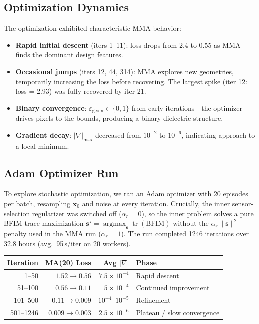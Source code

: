 \documentclass[11pt,a4paper]{article}
\newcommand{\tr}{\operatorname{tr}}
\newcommand{\argmax}{\operatorname{argmax}}
\begin{document}
\subsection{Optimization Dynamics}

The optimization exhibited characteristic MMA behavior:
\begin{itemize}[nosep]
  \item \textbf{Rapid initial descent} (iters 1--11): loss drops from 2.4 to 0.55 as MMA finds the dominant design features.
  \item \textbf{Occasional jumps} (iters 12, 44, 314): MMA explores new geometries, temporarily increasing the loss before recovering.  The largest spike (iter 12: loss = 2.93) was fully recovered by iter 21.
  \item \textbf{Binary convergence}: $\varepsilon_{\text{geom}} \in \{0, 1\}$ from early iterations---the optimizer drives pixels to the bounds, producing a binary dielectric structure.
  \item \textbf{Gradient decay}: $|\nabla|_{\max}$ decreased from $10^{-2}$ to $10^{-6}$, indicating approach to a local minimum.
\end{itemize}

\subsection{Adam Optimizer Run}

To explore stochastic optimization, we ran an Adam optimizer with 20 episodes per batch, resampling $\bm{x}_0$ and noise at every iteration.  Crucially, the inner sensor-selection regularizer was switched off ($\alpha_r = 0$), so the inner problem solves a pure BFIM trace maximization $\bm{s}^\star = \argmax_{\bm{s}} \tr(\text{BFIM})$ without the $\alpha_r \|\bm{s}\|^2$ penalty used in the MMA run ($\alpha_r = 1$).  The run completed 1246 iterations over 32.8 hours (avg.\ 95\,s/iter on 20 workers).

\begin{center}
\begin{tabular}{@{}rrrl@{}}
\toprule
Iteration & MA(20) Loss & Avg $|\nabla|$ & Phase \\
\midrule
1--50   & $1.52 \to 0.56$ & $7.5 \times 10^{-4}$ & Rapid descent \\
51--100 & $0.56 \to 0.11$ & $5 \times 10^{-4}$   & Continued improvement \\
101--500 & $0.11 \to 0.009$ & $10^{-4}$--$10^{-5}$ & Refinement \\
501--1246 & $0.009 \to 0.003$ & $2.5 \times 10^{-6}$ & Plateau / slow convergence \\
\bottomrule
\end{tabular}
\end{center}
\end{document}
